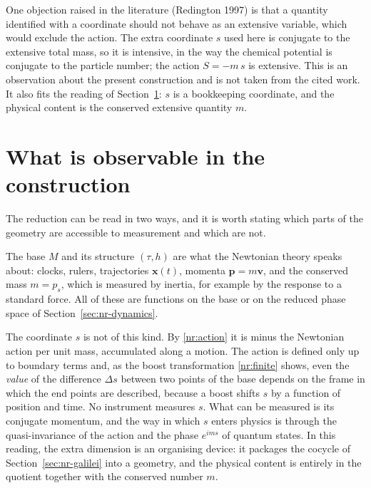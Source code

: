One objection raised in the literature (Redington 1997) is that a quantity
identified with a coordinate should not behave as an extensive variable, which
would exclude the action. The extra coordinate $s$ used here is conjugate to the
extensive total mass, so it is intensive, in the way the chemical potential is
conjugate to the particle number; the action $S=-m\,s$ is extensive. This is an
observation about the present construction and is not taken from the cited work.
It also fits the reading of Section~\ref{sec:nr-observable}: $s$ is a bookkeeping
coordinate, and the physical content is the conserved extensive quantity $m$.

\section{What is observable in the construction}
\label{sec:nr-observable}

The reduction can be read in two ways, and it is worth stating which parts of
the geometry are accessible to measurement and which are not.

The base $M$ and its structure $(\tau,h)$ are what the Newtonian theory
speaks about: clocks, rulers, trajectories $\mathbf{x}(t)$, momenta
$\mathbf{p}=m\mathbf{v}$, and the conserved mass $m=p_s$, which is measured by
inertia, for example by the response to a standard force. All of these are
functions on the base or on the reduced phase space of Section~\ref{sec:nr-dynamics}.

The coordinate $s$ is not of this kind. By \eqref{nr:action} it is minus the
Newtonian action per unit mass, accumulated along a motion. The action is
defined only up to boundary terms and, as the boost transformation
\eqref{nr:finite} shows, even the \emph{value} of the difference $\Delta s$
between two points of the base depends on the frame in which the end
points are described, because a boost shifts $s$ by a function of position and
time. No instrument measures $s$. What can be measured is its conjugate momentum,
and the way in which $s$ enters physics is through the quasi-invariance of the
action and the phase $e^{ims}$ of quantum states. In this reading, the extra
dimension is an organising device: it packages the cocycle of
Section~\ref{sec:nr-galilei} into a geometry, and the physical content is
entirely in the quotient together with the conserved number $m$.

